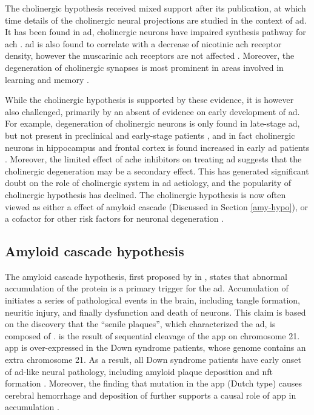 The cholinergic hypothesis received mixed support after its publication, at which time details of the cholinergic neural projections are studied in the context of \gls{ad}. It has been found in \gls{ad}, cholinergic neurons have impaired synthesis pathway for \gls{ach} \citep{milner87}. \gls{ad} is also found to correlate with a decrease of nicotinic \gls{ach} receptor density, however the muscarinic \gls{ach} receptors are not affected \citep{nordberg92, burghaus00}. Moreover, the degeneration of cholinergic synapses is most prominent in areas involved in learning and memory \citep{geula96}. 

While the cholinergic hypothesis is supported by these evidence, it is however also challenged, primarily by an absent of evidence on early development of \gls{ad}. For example, degeneration of cholinergic neurons is only found in late-stage \gls{ad}, but not present in preclinical and early-stage patients \citep{davis99}, and in fact cholinergic neurons in hippocampus and frontal cortex is found increased in early \gls{ad} patients \citep{dekosky02}. Moreover, the limited effect of \gls{ache} inhibitors on treating \gls{ad} suggests that the cholinergic degeneration may be a secondary effect. This has generated significant doubt on the role of cholinergic system in \gls{ad} aetiology, and the popularity of cholinergic hypothesis has declined. The cholinergic hypothesis is now often viewed as either a effect of amyloid cascade (Discussed in Section \ref{amy-hypo}), or a cofactor for other risk factors for neuronal degeneration \citep{roberson97, contestabile11}.


\subsection{Amyloid cascade hypothesis\label{amy-hypo}}
The amyloid cascade hypothesis, first proposed by \citeauthor{hardy92} in \citeyear{hardy92}, states that abnormal accumulation of the protein \abeta{} is a primary trigger for the \gls{ad}. Accumulation of \abeta{} initiates a series of pathological events in the brain, including tangle formation, neuritic injury, and finally dysfunction and death of neurons. This claim is based on the discovery that the ``senile plaques'', which characterized the \gls{ad}, is composed of \abeta{} \citep{masters85}. \abeta{} is the result of sequential cleavage of the \gls{app} on chromosome 21. \Gls{app} is over-expressed in the Down syndrome patients, whose genome contains an extra chromosome 21. As a result, all Down syndrome patients have early onset of \gls{ad}-like neural pathology, including amyloid plaque deposition and \gls{nft} formation \citep{wisniewski85, hardy02}. Moreover, the finding that mutation in the \gls{app} (Dutch type) causes cerebral hemorrhage and deposition of \abeta{} further supports a causal role of \gls{app} in \abeta{} accumulation \citep{hardy02}.

